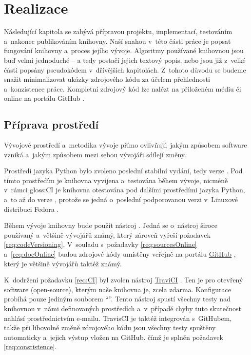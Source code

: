 \chapter{Realizace}

	Následující kapitola se zabývá přípravou projektu, implementací, testováním a~nakonec publikováním knihovny. 
	Naší snahou v~této části práce je popsat fungování knihovny a~proces jejího vývoje. Algoritmy používané knihovnou jsou buď velmi jednoduché -- a tedy postačí jejich textový popis, nebo jsou již z~velké části popsány pseudokódem v~dřívějších kapitolách. Z~tohoto důvodu se budeme snažit minimalizovat ukázky zdrojového kódu za účelem přehlednosti a~konzistence práce. Kompletní zdrojový kód lze nalézt na přiloženém médiu či online na portálu GitHub \cite{GrammpyProject}.

	\section{Příprava prostředí}
		
		Vývojové prostředí a~metodika vývoje přímo ovlivňují, jakým způsobem software vzniká a~jakým způsobem mezi sebou vývojáři sdílejí změny.
		
		Prostředí jazyka Python bylo zvoleno poslední stabilní vydání, tedy verze . Pod tímto prostředím je knihovna vyvíjena a~testována během vývoje, nicméně v~rámci \gls{gloss:CI} je knihovna otestována pod dalšími prostředími jazyka Python, a~to až do verze , protože se jedná o~poslední podporovanou verzi v~Linuxové distribuci Fedora \cite{FedoraMultiplePythons}.
	
		Během vývoje knihovny bude použit nástroj . Jedná se o~nástroj široce používaný \cite{VersionControlSystem2016}
		a~většině vývojářů známý, který zároveň vyřeší požadavek \ref{req:codeVersioning}. V~souladu s~požadavky \ref{req:sourcesOnline} a~\ref{req:docOnline} budou zdrojové kódy umístěny veřejně na portálu \hyperlink{https://github.com/}{GitHub} \cite{GrammpyProject}, který je většině vývojářů taktéž známý.
		
		K~dodržení požadavku \ref{req:CI} byl zvolen nástroj \hyperlink{https://travis-ci.org/}{TraviCI} \cite{Travis}. Ten je pro otevřený software (open-source), kterým naše knihovna je, zcela zdarma. Konfigurace probíhá pouze jediným souborem \enquote{}. Tento nástroj spustí všechny testy nad knihovnou v~námi definovaných prostředích a~v~případě chyby tuto skutečnost nahlásí prostřednictvím e-mailu. TravisCI je taktéž integrován s~GitHubem, takže při libovolné změně zdrojového kódu jsou všechny testy spuštěny automaticky a~jejich výstup vložen na GitHub. čímž je splněn požadavek \ref{req:constistence}.
		
